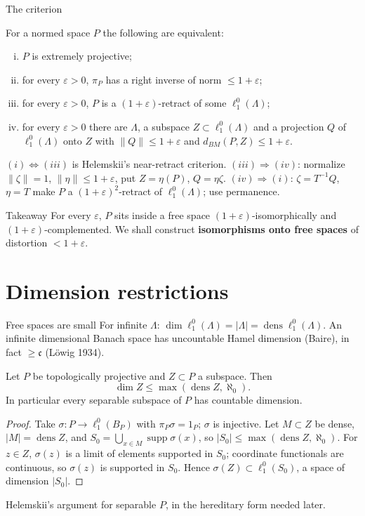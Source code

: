 \documentclass[10pt,aspectratio=169]{beamer}
\newcommand{\lo}[1]{\ell_1^0(#1)}
\newcommand{\supp}{\operatorname{supp}}
\newcommand{\dens}{\operatorname{dens}}
\newcommand{\BM}{d_{BM}}
\begin{document}
\begin{frame}{The criterion}
  \begin{theorem}
    For a normed space $P$ the following are equivalent:
    \begin{enumerate}[(i)]
      \item $P$ is extremely projective;
      \item for every $\varepsilon>0$, $\pi_P$ has a right inverse of norm $\le1+\varepsilon$;
      \item for every $\varepsilon>0$, $P$ is a $(1+\varepsilon)$-retract of some $\lo\Lambda$;
      \item for every $\varepsilon>0$ there are $\Lambda$, a subspace
        $Z\subset\lo\Lambda$ and a projection $Q$ of $\lo\Lambda$ onto $Z$ with
        $\|Q\|\le1+\varepsilon$ and $\BM(P,Z)\le1+\varepsilon$.
    \end{enumerate}
  \end{theorem}
  $(i)\Leftrightarrow(iii)$ is Helemskii's near-retract criterion.
  $(iii)\Rightarrow(iv)$: normalize $\|\zeta\|=1$, $\|\eta\|\le1+\varepsilon$,
  put $Z=\eta(P)$, $Q=\eta\zeta$.
  $(iv)\Rightarrow(i)$: $\zeta=T^{-1}Q$, $\eta=T$ make $P$ a
  ${(1+\varepsilon)}^2$-retract of $\lo\Lambda$; use permanence.
  \begin{alertblock}{Takeaway}
    For every $\varepsilon$, $P$ sits inside a free space
    $(1+\varepsilon)$-isomorphically and $(1+\varepsilon)$-complemented.
    We shall construct \textbf{isomorphisms onto free spaces} of
    distortion $<1+\varepsilon$.
  \end{alertblock}
\end{frame}

\section{Dimension restrictions}

\begin{frame}{Free spaces are small}
  For infinite $\Lambda$: $\dim\lo\Lambda=|\Lambda|=\dens\lo\Lambda$. An infinite
  dimensional Banach space has uncountable Hamel dimension (Baire), in fact
  $\ge\mathfrak c$ (L\"owig 1934).
  \begin{theorem}
    Let $P$ be topologically projective and $Z\subset P$ a subspace. Then
    \[
      \dim Z\le\max(\dens Z,\aleph_0).
    \]
    In particular every separable subspace of $P$ has countable dimension.
  \end{theorem}
  \begin{proof}
    Take $\sigma\colon P\to\lo{B_P}$ with $\pi_P\sigma=1_P$; $\sigma$ is injective.
    Let $M\subset Z$ be dense, $|M|=\dens Z$, and
    $S_0=\bigcup_{x\in M}\supp\sigma(x)$, so $|S_0|\le\max(\dens Z,\aleph_0)$.
    For $z\in Z$, $\sigma(z)$ is a limit of elements supported in $S_0$;
    coordinate functionals are continuous, so $\sigma(z)$ is supported in $S_0$.
    Hence $\sigma(Z)\subset\lo{S_0}$, a space of dimension $|S_0|$.
  \end{proof}
  Helemskii's argument for separable $P$, in the hereditary form needed later.
\end{frame}
\end{document}
